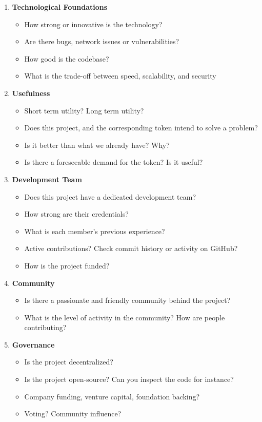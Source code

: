 \begin{enumerate}
    \item \textbf{Technological Foundations}
    \begin{itemize}
        \item How strong or innovative is the technology?
        \item Are there bugs, network issues or vulnerabilities?
        \item How good is the codebase?
        \item What is the trade-off between speed, scalability, and security
    \end{itemize}
    \item \textbf{Usefulness}
    \begin{itemize}
        \item Short term utility? Long term utility?
        \item Does this project, and the corresponding token intend to solve a problem?
        \item Is it better than what we already have? Why?
        \item Is there a foreseeable demand for the token? Is it useful?
    \end{itemize}
    \item \textbf{Development Team}
    \begin{itemize}
        \item Does this project have a dedicated development team?
        \item How strong are their credentials? \item What is each member's previous experience? 
        \item Active contributions? Check commit history or activity on GitHub?
        \item How is the project funded?
    \end{itemize}
    \item \textbf{Community}
    \begin{itemize}
        \item Is there a passionate and friendly community behind the project?
        \item What is the level of activity in the community? How are people contributing?
    \end{itemize}
    \item \textbf{Governance}
    \begin{itemize}
        \item Is the project decentralized?
        \item Is the project open-source? Can you inspect the code for instance?
        \item Company funding, venture capital, foundation backing?
        \item Voting? Community influence?
    \end{itemize}
\end{enumerate}

